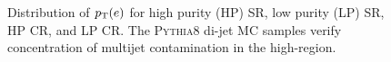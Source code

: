 \begin{figure}[h!tb]
\caption[Electron $\pT$ distribution including a di-jet Monte Carlo sample]{Distribution of $p_{\text{T}}(e)$ for \protect{} high purity (HP) SR, \protect{} low purity (LP) SR, \protect{} HP \Wjets CR, and \protect{} LP \Wjets CR. The \textsc{Pythia8} di-jet MC samples verify concentration of multijet contamination in the high-\pT region.}
\label{fig:qcdpt_el}
\end{figure}

